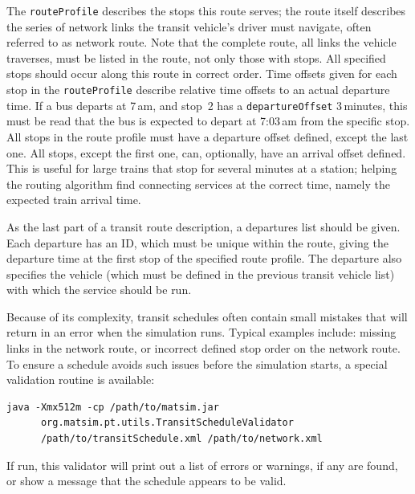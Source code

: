 The \lstinline|routeProfile| describes the stops this route serves; the route itself describes the series of network links the transit vehicle's driver must navigate, often referred to as network route. Note that the complete route, \ie all links the vehicle traverses, must be listed in the route, not only those with stops. All specified stops should occur along this route in correct order. Time offsets given for each stop in the \lstinline|routeProfile| describe relative time offsets to an actual departure time. If a bus departs at 7\,am, and stop~2 has a \lstinline|departureOffset| 3\,minutes, this must be read that the bus is expected to depart at 7:03\,am from the specific stop. All stops in the route profile must have a departure offset defined, except the last one. All stops, except the first one, can, optionally, have an arrival offset defined. This is useful for large trains that stop for several minutes at a station; helping the routing algorithm find connecting services at the correct time, namely the expected train arrival time.

As the last part of a transit route description, a departures list should be given. Each departure has an ID, which must be unique within the route, giving the departure time at the first stop of the specified route profile. The departure also specifies the vehicle (which must be defined in the previous transit vehicle list) with which the service should be run. 

Because of its complexity, transit schedules often contain small mistakes that will return in an error when the simulation runs. Typical examples include: missing links in the network route, or incorrect defined stop order on the network route. To ensure a schedule avoids such issues before the simulation starts, a special validation routine is available:
%
\begin{lstlisting}
java -Xmx512m -cp /path/to/matsim.jar  
      org.matsim.pt.utils.TransitScheduleValidator  
      /path/to/transitSchedule.xml /path/to/network.xml
\end{lstlisting}
%
If run, this validator will print out a list of errors or warnings, if any are found, or show a message that the schedule appears to be valid.

